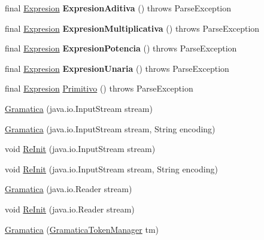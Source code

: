 \begin{DoxyCompactItemize}
final \mbox{\hyperlink{interfaceast_1_1_expresion}{Expresion}} {\bfseries Expresion\+Aditiva} ()  throws Parse\+Exception 
\item 
\mbox{\label{classanalizadores_1_1_gramatica_abea9e78545d093690b970a6a67c3ec50}} 
final \mbox{\hyperlink{interfaceast_1_1_expresion}{Expresion}} {\bfseries Expresion\+Multiplicativa} ()  throws Parse\+Exception 
\item 
\mbox{\label{classanalizadores_1_1_gramatica_ae43002e54f4963541e7037f47eb90397}} 
final \mbox{\hyperlink{interfaceast_1_1_expresion}{Expresion}} {\bfseries Expresion\+Potencia} ()  throws Parse\+Exception 
\item 
\mbox{\label{classanalizadores_1_1_gramatica_a7eed7dc65e9f1fa51dfa49bfa7bc09b8}} 
final \mbox{\hyperlink{interfaceast_1_1_expresion}{Expresion}} {\bfseries Expresion\+Unaria} ()  throws Parse\+Exception 
\item 
final \mbox{\hyperlink{interfaceast_1_1_expresion}{Expresion}} \mbox{\hyperlink{classanalizadores_1_1_gramatica_ab82d652de277a9f80090631b30637b09}{Primitivo}} ()  throws Parse\+Exception 
\item 
\mbox{\hyperlink{classanalizadores_1_1_gramatica_a542f05b9164371cc73d1b9a7e70eb031}{Gramatica}} (java.\+io.\+Input\+Stream stream)
\item 
\mbox{\hyperlink{classanalizadores_1_1_gramatica_ad399a661121ef126e864fd65af3e290a}{Gramatica}} (java.\+io.\+Input\+Stream stream, String encoding)
\item 
void \mbox{\hyperlink{classanalizadores_1_1_gramatica_a2e933863c9692a4f638603bb43e87d14}{Re\+Init}} (java.\+io.\+Input\+Stream stream)
\item 
void \mbox{\hyperlink{classanalizadores_1_1_gramatica_a68a64ba7053949788dbe012722aea06b}{Re\+Init}} (java.\+io.\+Input\+Stream stream, String encoding)
\item 
\mbox{\hyperlink{classanalizadores_1_1_gramatica_aa27ae694010ecb86720e64791da67ad5}{Gramatica}} (java.\+io.\+Reader stream)
\item 
void \mbox{\hyperlink{classanalizadores_1_1_gramatica_ab2a19eaeba5ef605daa7c8ddaab5a01c}{Re\+Init}} (java.\+io.\+Reader stream)
\item 
\mbox{\hyperlink{classanalizadores_1_1_gramatica_a636956e2b18cbfd38cdb38432c625cbd}{Gramatica}} (\mbox{\hyperlink{classanalizadores_1_1_gramatica_token_manager}{Gramatica\+Token\+Manager}} tm)

\end{DoxyCompactItemize}
